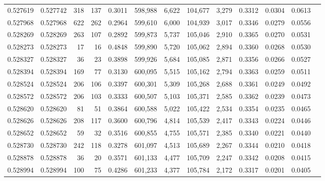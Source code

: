 \begin{tabular}{rrrrrrrrrrrrr}
0.527619 & 0.527742 &   318 &   137 &                                     0.3011 & 598,988 &   6,622 & 104,677 &   3,279 & 0.3312 & 0.0304 & 0.0613 \\
0.527968 & 0.527968 &   622 &   262 &                                     0.2964 & 599,610 &   6,000 & 104,939 &   3,017 & 0.3346 & 0.0279 & 0.0556 \\
0.528269 & 0.528269 &   263 &   107 &                                     0.2892 & 599,873 &   5,737 & 105,046 &   2,910 & 0.3365 & 0.0270 & 0.0531 \\
0.528273 & 0.528273 &    17 &    16 &                                     0.4848 & 599,890 &   5,720 & 105,062 &   2,894 & 0.3360 & 0.0268 & 0.0530 \\
0.528327 & 0.528327 &    36 &    23 &                                     0.3898 & 599,926 &   5,684 & 105,085 &   2,871 & 0.3356 & 0.0266 & 0.0527 \\
0.528394 & 0.528394 &   169 &    77 &                                     0.3130 & 600,095 &   5,515 & 105,162 &   2,794 & 0.3363 & 0.0259 & 0.0511 \\
0.528524 & 0.528524 &   206 &   106 &                                     0.3397 & 600,301 &   5,309 & 105,268 &   2,688 & 0.3361 & 0.0249 & 0.0492 \\
0.528572 & 0.528572 &   206 &   103 &                                     0.3333 & 600,507 &   5,103 & 105,371 &   2,585 & 0.3362 & 0.0239 & 0.0473 \\
0.528620 & 0.528620 &    81 &    51 &                                     0.3864 & 600,588 &   5,022 & 105,422 &   2,534 & 0.3354 & 0.0235 & 0.0465 \\
0.528626 & 0.528626 &   208 &   117 &                                     0.3600 & 600,796 &   4,814 & 105,539 &   2,417 & 0.3343 & 0.0224 & 0.0446 \\
0.528652 & 0.528652 &    59 &    32 &                                     0.3516 & 600,855 &   4,755 & 105,571 &   2,385 & 0.3340 & 0.0221 & 0.0440 \\
0.528730 & 0.528730 &   242 &   118 &                                     0.3278 & 601,097 &   4,513 & 105,689 &   2,267 & 0.3344 & 0.0210 & 0.0418 \\
0.528878 & 0.528878 &    36 &    20 &                                     0.3571 & 601,133 &   4,477 & 105,709 &   2,247 & 0.3342 & 0.0208 & 0.0415 \\
0.528994 & 0.528994 &   100 &    75 &                                     0.4286 & 601,233 &   4,377 & 105,784 &   2,172 & 0.3317 & 0.0201 & 0.0405 \\

\end{tabular}
